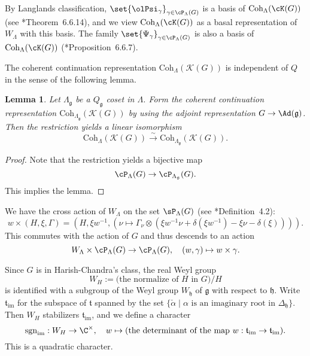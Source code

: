 \documentclass[12pt]{amsart}
\newcommand{\CK}{{\mathcal {K}}}
\newcommand{\g}{\mathfrak g}
\newcommand{\h}{\mathfrak h}
\renewcommand{\t}{\mathfrak t}
\numberwithin{equation}{section}
\newtheorem{lem}[thm]{Lemma}
\theoremstyle{remark}
\def\cf{\emph{cf.} }
\newcommand{\cross}{\times}
\def\Coh{\mathrm{Coh}}
\newcommand{\Lam}{{[\lambda]}}
\begin{document}
By Langlands classification,
$\set{\olPsi_{\gamma}}_{\gamma\in \cP_{\Lambda}(G)}$ is a basis of
$\Coh_{\Lambda}(\cK(G))$   (see \cite{Vg}*{Theorem~6.6.14}), and we view $\Coh_\Lambda(\cK(G))$ as a basal representation of $W_\Lambda$ with this basis. %
The family  $\set{\Psi_{\gamma}}_{\gamma\in \cP_{\Lambda}(G)}$ is also a basis of $\Coh_{\Lambda}(\cK(G))$ (\cite{Vg}*{Proposition~6.6.7}).




The coherent continuation representation  $\Coh_{\Lambda}(\CK(G))$ is independent of $Q$ in the sense of the following lemma.
\begin{lem}%
Let $\Lambda_\g$ be a $Q_\g$ coset in $\Lambda$.  Form the coherent continuation representation $\Coh_{\Lambda_\g}(\CK(G))$ by using the adjoint representation $G\rightarrow \Ad(\g)$. Then the restriction yields a linear isomorphism
\[
  \Coh_{\Lambda}(\CK(G))\xrightarrow{\sim} \Coh_{\Lambda_\g}(\CK(G)).
\]
\end{lem}
\begin{proof}
Note that the restriction yields a bijective map
\[
   \cP_{\Lambda}(G)\rightarrow  \cP_{\Lambda_\g}(G).
\]
This implies the lemma. %
\end{proof}


We have the cross action of $W_{\Lambda}$ on the set $ \sP_{\Lambda}(G)$ (see \cite{V4}*{Definition~4.2}):
\[
  w\cross(H, \xi, \Gamma)=\left(H, \xi w^{-1}, (\nu\mapsto \Gamma_\nu\otimes (\xi w^{-1}\nu+\delta(\xi w^{-1})-\xi \nu-\delta(\xi)) )\right).
\]
This commutes with the action of $G$ and thus descends to an action
\[
 W_{\Lambda}\times   \cP_{\Lambda}(G)\rightarrow \cP_{\Lambda}(G), \quad (w, \gamma)\mapsto w\cross \gamma.
 \]


Since $G$ is in Harish-Chandra's class, the real Weyl group
\[
W_H:=\textrm{(the normalize of $H$ in $G$)}/H
\]
 is identified with a subgroup of the Weyl group $W_\h$ of $\g$ with respect to $\h$.
Write $\t_{\mathrm{im}}$ for the subspace of $\t$ spanned by the set $\{\check \alpha\mid \alpha \textrm{ is an imaginary root in $\Delta_\h$}\}$. Then $W_H$ stabilizers $\t_{\mathrm{im}}$, and we define a character
\[
  \mathrm{sgn}_\mathrm{im}: W_H\rightarrow \C^\times, \quad w\mapsto \textrm{(the determinant of the map $w: \t_{\mathrm{im}}\rightarrow \t_{\mathrm{im}}$)}.
\]
This is a quadratic character.
\end{document}
